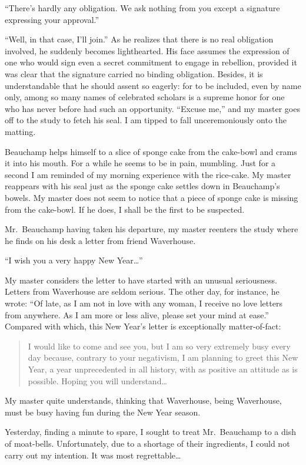 \documentclass{book}
\begin{document}
``There's hardly any obligation. We ask nothing from you except a
signature expressing your approval.''

``Well, in that case, I'll join.'' As he realizes that there is no real
obligation involved, he suddenly becomes lighthearted. His face assumes
the expression of one who would sign even a secret commitment to engage
in rebellion, provided it was clear that the signature carried no
binding obligation. Besides, it is understandable that he should assent
so eagerly: for to be included, even by name only, among so many names
of celebrated scholars is a supreme honor for one who has never before
had such an opportunity. ``Excuse me,'' and my master goes off to the
study to fetch his seal. I am tipped to fall unceremoniously onto the
matting.

Beauchamp helps himself to a slice of sponge cake from the cake-bowl and
crams it into his mouth. For a while he seems to be in pain, mumbling.
Just for a second I am reminded of my morning experience with the
rice-cake. My master reappears with his seal just as the sponge cake
settles down in Beauchamp's bowels. My master does not seem to notice
that a piece of sponge cake is missing from the cake-bowl. If he does, I
shall be the first to be suspected.

Mr.~Beauchamp having taken his departure, my master reenters the study
where he finds on his desk a letter from friend Waverhouse.

``I wish you a very happy New Year\ldots{}''

My master considers the letter to have started with an unusual
seriousness. Letters from Waverhouse are seldom serious. The other day,
for instance, he wrote: ``Of late, as I am not in love with any woman, I
receive no love letters from anywhere. As I am more or less alive,
please set your mind at ease.'' Compared with which, this New Year's
letter is exceptionally matter-of-fact:

\blockquote{I would like to come and see you, but I am so very extremely busy every
day because, contrary to your negativism, I am planning to greet this
New Year, a year unprecedented in all history, with as positive an
attitude as is possible. Hoping you will understand\ldots{}}

My master quite understands, thinking that Waverhouse, being Waverhouse,
must be busy having fun during the New Year season.

Yesterday, finding a minute to spare, I sought to treat Mr.~Beauchamp to
a dish of moat-bells. Unfortunately, due to a shortage of their
ingredients, I could not carry out my intention. It was most
regrettable\ldots{}
\end{document}
